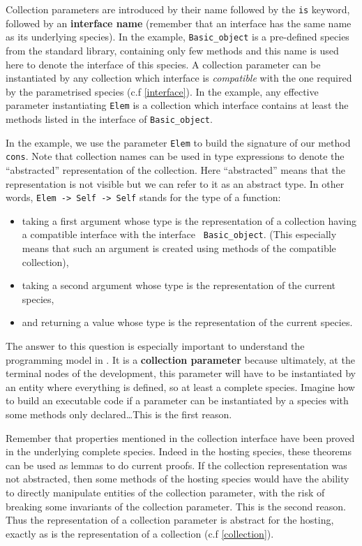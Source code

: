 Collection parameters are introduced by their name followed by the
{\tt is} keyword, followed by an {\bf interface name} (remember that
an interface has the same name as its underlying species). In the
example, {\tt Basic\_object} is a pre-defined species  from the
standard library, containing only few methods and this name is used
here to denote the interface of this species.   A
collection parameter can be instantiated by any collection which
interface is {\em
  compatible} with the one required by
the parametrised species (c.f \ref{interface}). In the example, any
effective parameter instantiating {\tt Elem} is a collection which
interface contains at least the methods  listed in the interface of
{\tt Basic\_object}. 

\smallskip
In the example, we use the parameter {\tt Elem} to build the signature
of our method {\tt cons}. Note that collection names can be used
in type expressions to denote the ``abstracted'' representation of the
collection. Here ``abstracted'' means that the
representation is not visible but we can refer to it
as an abstract type. In other words, {\tt Elem -> Self -> Self}
stands for the type of a function:
\begin{itemize}
\item taking a first argument whose type is the representation  of a
  collection having a compatible interface with the interface {\tt
    Basic\_object}. (This especially means that such an argument is
  created using methods of the compatible collection),
  \item taking a second argument whose type is the representation of
    the current species,
  \item and returning a value whose type is the representation  of the
    current species.
\end{itemize}


The answer to this question is especially important to
understand the programming model in \focal. It is a {\bf collection
  parameter} because ultimately, at the terminal nodes of the
development, this parameter will have to be instantiated by an entity
where everything is defined, so at least a complete species. Imagine
how to build an executable code if a parameter can be instantiated by
a species with some methods only declared\ldots This is the first
reason. 
 
Remember that properties mentioned in the collection interface have
been proved in the underlying complete species. Indeed in the hosting
species, these theorems can be used as lemmas to do current proofs. If
the collection representation was not abstracted, then some methods of
the hosting species would have the ability to directly manipulate
entities of the collection parameter, with the risk of breaking some
invariants of the collection parameter.  This is the second reason.
Thus the representation of a collection parameter is abstract for the
hosting, exactly as is the representation of a collection (c.f
\ref{collection}).

